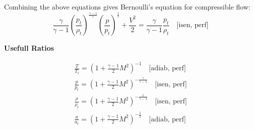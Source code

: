 Combining the above equations gives Bernoulli's equation for compressible flow:
\begin{equation}
	\frac{\gamma}{\gamma - 1} \left(\frac{p_t}{\rho_t}\right)^{\frac{\gamma - 1}{\gamma}} \left(\frac{p}{p_t}\right)^{\frac{1}{\gamma}} + \frac{V^2}{2} = \frac{\gamma}{\gamma - 1} \frac{p_t}{\rho_t}\quad \text{[isen, perf]} \tag{36}
\end{equation}

\textbf{Usefull Ratios}

\begin{gather}
	\frac{T}{T_t} = \left(1 + \frac{\gamma - 1}{2} M^2 \right)^{-1}
	\quad \text{[adiab, perf]} \tag{43} \\
	\frac{p}{p_t} = \left(1 + \frac{\gamma - 1}{2} M^2 \right)^{-\frac{\gamma}{\gamma - 1}}
	\quad \text{[isen, perf]} \tag{44} \\
	\frac{\rho}{\rho_t} = \left(1 + \frac{\gamma - 1}{2} M^2 \right)^{-\frac{1}{\gamma - 1}}
	\quad \text{[isen, perf]} \tag{45} \\
	\frac{a}{a_t} = \left(1 + \frac{\gamma - 1}{2} M^2 \right)^{-\frac{1}{2}}
	\quad \text{[adiab, perf]} \tag{46}
\end{gather}
